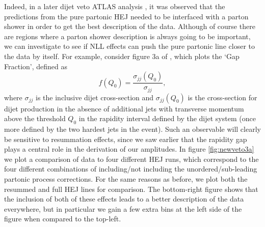 Indeed, in a later dijet veto ATLAS analysis \cite{Aad2014}, it was observed that the predictions from the pure partonic HEJ needed to be interfaced with a parton shower in order to get the best description of the data. Although of course there are regions where a parton shower description is always going to be important, we can investigate to see if NLL effects can push the pure partonic line closer to the data by itself. For example, consider figure 3a of \cite{Aad2014}, which plots the `Gap Fraction', defined as
\begin{equation}
f(Q_0) = \frac{\sigma_{jj}(Q_0)}{\sigma_{jj}},
\end{equation}
where $\sigma_{jj}$ is the inclusive dijet cross-section and $\sigma_{jj}(Q_0)$ is the cross-section for dijet production in the absence of additional jets with transverse momentum above the threshold $Q_0$ in the rapidity interval defined by the dijet system (once more defined by the two hardest jets in the event). Such an observable will clearly be sensitive to resummation effects, since we saw earlier that the rapidity gap plays a central role in the derivation of our amplitudes. In figure \ref{fig:newveto3a} we plot a comparison of data to four different HEJ runs, which correspond to the four different combinations of including/not including the unordered/sub-leading partonic process corrections. For the same reasons as before, we plot both the resummed and full HEJ lines for comparison. The bottom-right figure shows that the inclusion of both of these effects leads to a better description of the data everywhere, but in particular we gain a few extra bins at the left side of the figure when compared to the top-left.

